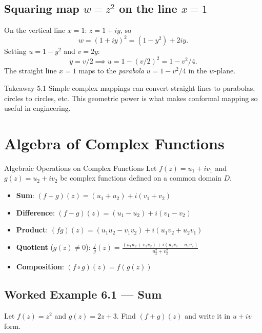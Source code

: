 \documentclass[12pt,a4paper]{article}
\begin{document}
\subsection*{Squaring map \(w = z^2\) on the line \(x = 1\)}

On the vertical line \(x=1\): \(z = 1+iy\), so
\[
  w = (1+iy)^2 = (1-y^2)+2iy.
\]
Setting \(u = 1-y^2\) and \(v = 2y\):
\[
  y = v/2 \implies u = 1 - (v/2)^2 = 1 - v^2/4.
\]
The straight line \(x=1\) maps to the \emph{parabola} \(u = 1-v^2/4\) in
the \(w\)-plane.

\begin{learnbox}{Takeaway 5.1}
Simple complex mappings can convert straight lines to parabolas, circles to
circles, etc.  This geometric power is what makes conformal mapping so
useful in engineering.
\end{learnbox}

\section{Algebra of Complex Functions}

\begin{infobox}{Algebraic Operations on Complex Functions}
Let \(f(z) = u_1+iv_1\) and \(g(z) = u_2+iv_2\) be complex functions
defined on a common domain \(D\).
\begin{itemize}[noitemsep]
  \item \textbf{Sum}: \((f+g)(z) = (u_1+u_2)+i(v_1+v_2)\)
  \item \textbf{Difference}: \((f-g)(z) = (u_1-u_2)+i(v_1-v_2)\)
  \item \textbf{Product}: \((fg)(z) = (u_1 u_2 - v_1 v_2)+i(u_1 v_2+u_2 v_1)\)
  \item \textbf{Quotient} (\(g(z)\neq 0\)):
        \(\displaystyle\frac{f}{g}(z) =
          \frac{(u_1 u_2+v_1 v_2)+i(u_2 v_1-u_1 v_2)}{u_2^2+v_2^2}\)
  \item \textbf{Composition}: \((f\circ g)(z) = f(g(z))\)
\end{itemize}
\end{infobox}

\subsection*{Worked Example 6.1 --- Sum}

Let \(f(z) = z^2\) and \(g(z) = 2z+3\).  Find \((f+g)(z)\) and write it in
\(u+iv\) form.
\end{document}
